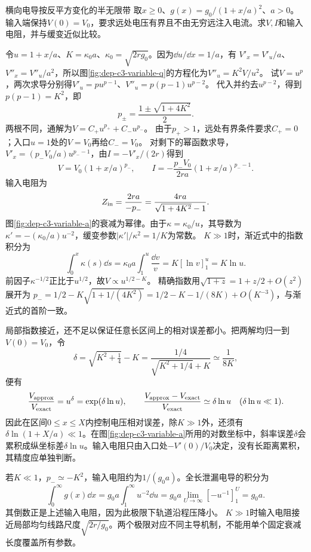 \begin{example}横向电导按反平方变化的半无限带
取$x\geq0$、$g(x)=g_0/(1+x/a)^2$、$a>0$。输入端保持$V(0)=V_0$，要求远处电压有界且不由无穷远注入电流。求$V,I$和输入电阻，并与缓变近似比较。
\end{example}
\begin{solution}
令$u=1+x/a$、$K=\kappa_0a$、$\kappa_0=\sqrt{2rg_0}$。因为$\dd u/\dd x=1/a$，有
$V'_x=V'_u/a$、$V''_x=V''_u/a^2$，所以图\ref{fig:dep-c3-variable-q}的方程化为$V''_u=K^2V/u^2$。
试$V=u^p$，两次求导分别得$V'_u=pu^{p-1}$、$V''_u=p(p-1)u^{p-2}$。
代入并约去$u^{p-2}$，得到$p(p-1)=K^2$，即
\[
 p_\pm=\frac{1\pm\sqrt{1+4K^2}}2.
\]
两根不同，通解为$V=C_+u^{p_+}+C_-u^{p_-}$。
由于$p_+>1$，远处有界条件要求$C_+=0$；入口$u=1$处的$V=V_0$再给$C_-=V_0$。
对剩下的幂函数求导，$V'_x=(p_-V_0/a)u^{p_--1}$，由$I=-V'_x/(2r)$得到
\[
 V=V_0(1+x/a)^{p_-},\qquad
 I=-\frac{p_-V_0}{2ra}(1+x/a)^{p_--1}.
\]
输入电阻为
\[
 Z_{\rm in}=\frac{2ra}{-p_-}
 =\frac{4ra}{\sqrt{1+4K^2}-1}.
\]
图\ref{fig:dep-c3-variable-a}的衰减为幂律。由于$\kappa=\kappa_0/u$，其导数为
$\kappa'=-(\kappa_0/a)u^{-2}$，缓变参数$|\kappa'|/\kappa^2=1/K$为常数。
$K\gg1$时，渐近式中的指数积分为
\[
 \int_0^x\kappa(s)\dd s
 =\kappa_0a\int_1^u\frac{\dd v}{v}
 =K[\ln v]_1^u=K\ln u.
\]
前因子$\kappa^{-1/2}$正比于$u^{1/2}$，故$V\propto u^{1/2-K}$。
精确指数用$\sqrt{1+z}=1+z/2+O(z^2)$展开为
$p_-=1/2-K\sqrt{1+1/(4K^2)}=1/2-K-1/(8K)+O(K^{-3})$，与渐近式的首阶一致。

局部指数接近，还不足以保证任意长区间上的相对误差都小。把两解均归一到$V(0)=V_0$，令
\[
 \delta=\sqrt{K^2+\tfrac14}-K
 =\frac{1/4}{\sqrt{K^2+1/4}+K}\simeq\frac1{8K},
\]
便有
\[
 \frac{V_{\rm approx}}{V_{\rm exact}}=u^\delta
 =\exp(\delta\ln u),\qquad
 \frac{V_{\rm approx}-V_{\rm exact}}{V_{\rm exact}}
 \simeq\delta\ln u\quad(\delta\ln u\ll1).
\]
因此在区间$0\leq x\leq X$内控制电压相对误差，除$K\gg1$外，还须有$\delta\ln(1+X/a)\ll1$。在图\ref{fig:dep-c3-variable-a}所用的对数坐标中，斜率误差$\delta$会累积成纵坐标差$\delta\ln u$。输入电阻只由入口处$-V'(0)/V_0$决定，没有长距离累积，其精度应单独判断。

若$K\ll1$，$p_-\simeq-K^2$，输入电阻约为$1/(g_0a)$。全长泄漏电导的积分为
\[
 \int_0^\infty g(x)\dd x
 =g_0a\int_1^\infty u^{-2}\dd u
 =g_0a\lim_{U\to\infty}[-u^{-1}]_1^U=g_0a.
\]
其倒数正是上述输入电阻，因为此极限下轨道沿程压降小。
$K\gg1$时输入电阻接近局部均匀线路尺度$\sqrt{2r/g_0}$。两个极限对应不同主导机制，不能用单个固定衰减长度覆盖所有参数。
\end{solution}
